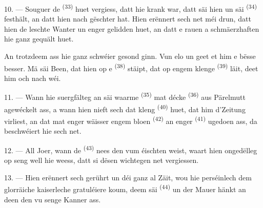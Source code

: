 \VUsaut{4.2mm}
\VUsaut{3.0mm}

10. --- Souguer de  \textsuperscript{(33)} huet vergiess, datt hie krank
war, datt säi  hien un säi  \textsuperscript{(34)}
festhält, an datt hien nach gëschter  hat. Hien
erënnert sech net méi drun, datt hien de leschte Wanter un enger
 gelidden huet, an datt e rauen a schmäerzhaften
 hie ganz gequält huet.

An trotzdeem ass hie ganz schwéier gesond ginn. Vun elo un geet et him e bësse
besser. Mä säi Been, dat hien op e  \textsuperscript{(38)} stäipt, dat
op engem klenge  \textsuperscript{(39)} läit, deet him och nach wéi.

11. --- Wann hie suergfälteg an säi waarme  \textsuperscript{(35)}
mat décke  \textsuperscript{(36)} aus Pärelmutt agewéckelt ass, a wann
hien nieft sech dat kleng  \textsuperscript{(40)} huet, dat him
d'Zeitung virliest, an dat mat enger wäisser  engem bloen
 \textsuperscript{(42)} an enger 
\textsuperscript{(41)} ugedoen ass, da beschwéiert hie sech net.

12. --- All Joer, wann de  \textsuperscript{(43)} nees den
 vum éischten  weist, waart hien ongedëlleg op seng
 well hie weess, datt si dësen wichtegen  net
vergiessen.

13. --- Hien erënnert sech gerührt un déi ganz al Zäit, wou hie perséinlech dem
glorräiche kaiserleche  gratuléiere koum, deem säi
 \textsuperscript{(44)} un der Mauer hänkt an deen den
 vu senge Kanner ass.

\VUsaut{6.0mm}
\VUfilet{22mm}
